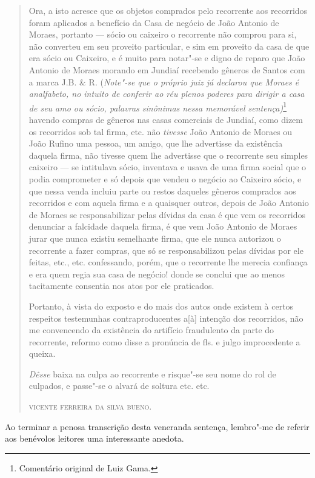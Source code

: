 \begin{quote}
Ora, a isto acresce que os objetos comprados pelo recorrente aos
recorridos foram aplicados a benefício da Casa de negócio de João
Antonio de Moraes, portanto --- sócio ou caixeiro o recorrente não
comprou para si, não converteu em seu proveito particular, e sim em
proveito da casa de que era sócio ou Caixeiro, e é muito para notar"-se e
digno de reparo que João Antonio de Moraes morando em Jundiaí recebendo
gêneros de Santos com a marca J.B. \& R. (\emph{Note"-se que o próprio
juiz já declarou que Moraes é analfabeto, no intuito de conferir ao réu
plenos poderes para dirigir a casa de seu amo ou sócio, palavras
sinônimas nessa memorável sentença)}\footnote{Comentário original de
  Luiz Gama.} havendo compras de gêneros nas casas comerciais de
Jundiaí, como dizem os recorridos sob tal firma, etc. não \emph{tivesse}
João Antonio de Moraes ou João Rufino uma pessoa, um amigo, que lhe
advertisse da existência daquela firma, não tivesse quem lhe advertisse
que o recorrente seu simples caixeiro --- se intitulava sócio, inventava e
usava de uma firma social que o podia comprometer e só depois que vendeu
o negócio ao Caixeiro sócio, e que nessa venda incluiu parte ou restos
daqueles gêneros comprados aos recorridos e com aquela firma e a
quaisquer outros, depois de João Antonio de Moraes se responsabilizar
pelas dívidas da casa é que vem os recorridos denunciar a falcidade
daquela firma, é que vem João Antonio de Moraes jurar que nunca existiu
semelhante firma, que ele nunca autorizou o recorrente a fazer compras,
que só se responsabilizou pelas dívidas por ele feitas, etc., etc.
confessando, porém, que o recorrente lhe merecia confiança e era quem
regia sua casa de negócio! donde se conclui que ao menos tacitamente
consentia nos atos por ele praticados.

Portanto, à vista do exposto e do mais dos autos onde existem à certos
respeitos testemunhas contraproducentes a{[}à{]} intenção dos
recorridos, não me convencendo da existência do artifício fraudulento da
parte do recorrente, reformo como disse a pronúncia de fls. e julgo
improcedente a queixa.

\emph{Dêsse} baixa na culpa ao recorrente e risque"-se seu nome do rol de
culpados, e passe"-se o alvará de soltura etc. etc.

\medskip

\hfill\textsc{vicente ferreira da silva bueno.}
\end{quote}

\asterisc

Ao terminar a penosa transcrição desta veneranda sentença, lembro"-me de
referir aos benévolos leitores uma interessante anedota.

